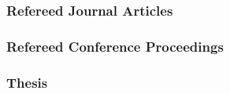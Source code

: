 %

%

\subsubsection*{Refereed Journal Articles}


%

\subsubsection*{Refereed Conference Proceedings}


%

%

%



%

\subsubsection*{Thesis}

